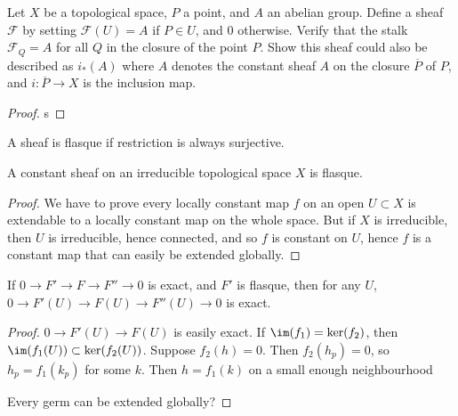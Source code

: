 \begin{theorem}
    Let $X$ be a topological space, $P$ a point, and $A$ an abelian group. Define a sheaf $\mathcal{F}$ by setting $\mathcal{F}(U) = A$ if $P \in U$, and 0 otherwise. Verify that the stalk $\mathcal{F}_Q = A$ for all $Q$ in the closure of the point $P$. Show this sheaf could also be described as $i_*(A)$ where $A$ denotes the constant sheaf $A$ on the closure $\overline{P}$ of $P$, and $i: \overline{P} \to X$ is the inclusion map.
\end{theorem}
\begin{proof}
    s
\end{proof}

A sheaf is flasque if restriction is always surjective.

\begin{theorem}
    A constant sheaf on an irreducible topological space $X$ is flasque.
\end{theorem}
\begin{proof}
    We have to prove every locally constant map $f$ on an open $U \subset X$ is extendable to a locally constant map on the whole space. But if $X$ is irreducible, then $U$ is irreducible, hence connected, and so $f$ is constant on $U$, hence $f$ is a constant map that can easily be extended globally.
\end{proof}

\begin{theorem}
    If $0 \to F' \to F \to F'' \to 0$ is exact, and $F'$ is flasque, then for any $U$, $0 \to F'(U) \to F(U) \to F''(U) \to 0$ is exact.
\end{theorem}
\begin{proof}
    $0 \to F'(U) \to F(U)$ is easily exact. If $\im(f_1) = \ker(f_2)$, then $\im(f_1(U)) \subset \ker(f_2(U))$. Suppose $f_2(h) = 0$. Then $f_2(h_p) = 0$, so $h_p = f_1(k_p)$ for some $k$. Then $h = f_1(k)$ on a small enough neighbourhood

    Every germ can be extended globally?
\end{proof}

